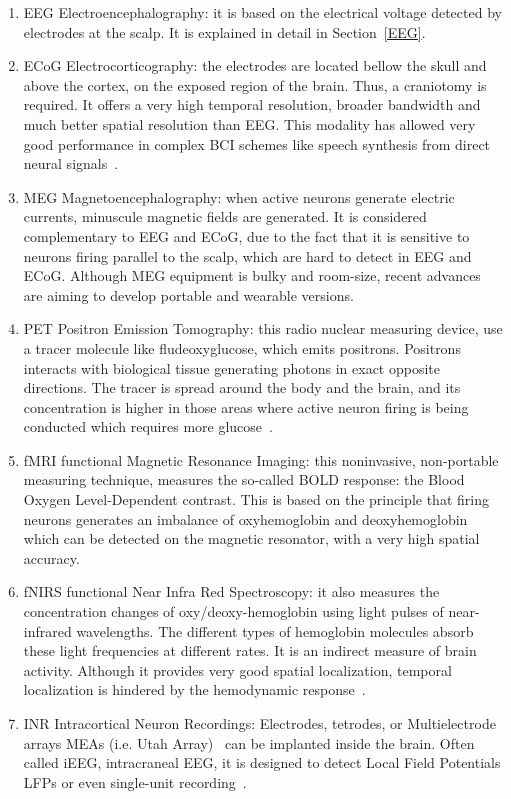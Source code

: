 \begin{enumerate}
\item EEG Electroencephalography: it is based on the electrical voltage detected by electrodes at the scalp.  It is explained in detail in Section~\ref{EEG}.
\item ECoG Electrocorticography: the electrodes are located bellow the skull and above the cortex, on the exposed region of the brain. Thus, a craniotomy is required.  It offers a very high temporal resolution, broader bandwidth and much better spatial resolution than EEG.  This modality has allowed very good performance in complex BCI schemes like speech synthesis from direct neural signals~\cite{Herff2016}.
\item MEG Magnetoencephalography: when active neurons generate electric currents, minuscule magnetic fields are generated.  It is considered complementary to EEG and ECoG, due to the fact that it is sensitive to neurons firing parallel to the scalp, which are hard to detect in EEG and ECoG.   Although MEG equipment is bulky and room-size, recent advances~\cite{Boto2018} are aiming to develop portable and wearable versions. 
\item PET Positron Emission Tomography: this radio nuclear measuring device, use a tracer molecule like fludeoxyglucose, which emits positrons.  Positrons interacts with biological tissue generating photons in exact opposite directions.  The tracer is spread around the body and the brain, and its concentration is higher in those areas where active neuron firing is being conducted which requires more glucose~\cite{Nam2010}. 
\item fMRI  functional Magnetic Resonance Imaging: this noninvasive, non-portable measuring technique, measures the so-called BOLD response: the Blood Oxygen Level-Dependent contrast.  This is based on the principle that firing neurons generates an imbalance of oxyhemoglobin and deoxyhemoglobin which can be detected on the magnetic resonator, with a very high spatial accuracy.
\item fNIRS  functional Near Infra Red Spectroscopy:  it also measures the concentration changes of oxy/deoxy-hemoglobin using light pulses of near-infrared wavelengths.  The different types of hemoglobin molecules absorb these light frequencies at different rates.  It is an indirect measure of brain activity.  Although it provides very good spatial localization, temporal localization is hindered by the hemodynamic response~\cite{Nam2010}.
\item INR Intracortical Neuron Recordings: Electrodes, tetrodes, or Multielectrode arrays MEAs (i.e. Utah Array)~\cite{Ajiboye2017} can be implanted inside the brain.  Often called iEEG, intracraneal EEG, it is designed to detect Local Field Potentials LFPs or even single-unit recording~\cite{Buzsaki2012}.
\end{enumerate}

